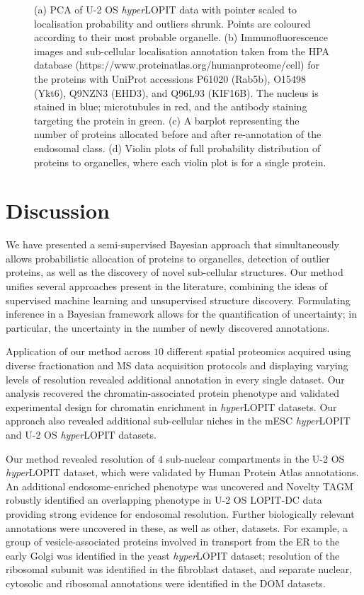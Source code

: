 \documentclass[12pt,english]{article}
\begin{document}
\begin{figure}[h]
\begin{subfigure}[t]{1\textwidth}
		\caption{}
	\end{subfigure}
	\caption{(a) PCA of U-2 OS \textit{hyper}LOPIT data with pointer scaled to localisation probability and outliers shrunk. Points are coloured according to their most probable organelle. (b) Immunofluorescence images and sub-cellular localisation annotation taken from the HPA database (https://www.proteinatlas.org/humanproteome/cell) for the proteins with UniProt accessions P61020 (Rab5b), O15498 (Ykt6), Q9NZN3 (EHD3), and Q96L93 (KIF16B). The nucleus is stained in blue; microtubules in red, and the antibody staining targeting the protein in green. (c) A barplot representing the number of proteins allocated before and after re-annotation of the endosomal class. (d) Violin plots of full probability distribution of proteins to organelles, where each violin plot is for a single protein.
	}
	\label{figure:u2os}
\end{figure}
\clearpage 
\section{Discussion}
We have presented a semi-supervised Bayesian approach that simultaneously allows probabilistic allocation of proteins to organelles, detection of outlier proteins, as well as the discovery of novel sub-cellular structures. Our method unifies several approaches present in the literature, combining the ideas of supervised machine learning and unsupervised structure discovery. Formulating inference in a Bayesian framework allows for the quantification of uncertainty; in particular, the uncertainty in the number of newly discovered annotations.

Application of our method across $10$ different spatial proteomics acquired using diverse fractionation and MS data acquisition protocols and displaying varying levels of resolution revealed additional annotation in every single dataset. Our analysis recovered the chromatin-associated protein phenotype and validated experimental design for chromatin enrichment in \textit{hyper}LOPIT datasets. Our approach also revealed additional sub-cellular niches in the mESC \textit{hyper}LOPIT and U-2 OS \textit{hyper}LOPIT datasets.

Our method revealed resolution of $4$ sub-nuclear compartments in the U-2 OS \textit{hyper}LOPIT dataset, which were validated by Human Protein Atlas annotations. An additional endosome-enriched phenotype was uncovered and Novelty TAGM robustly identified an overlapping phenotype in U-2 OS LOPIT-DC data providing strong evidence for endosomal resolution. Further biologically relevant annotations were uncovered in these, as well as other, datasets. For example, a group of vesicle-associated proteins involved in transport from the ER to the early Golgi was identified in the yeast \textit{hyper}LOPIT dataset; resolution of the ribosomal subunit was identified in the fibroblast dataset, and separate nuclear, cytosolic and ribosomal annotations were identified in the DOM datasets.
\end{document}
